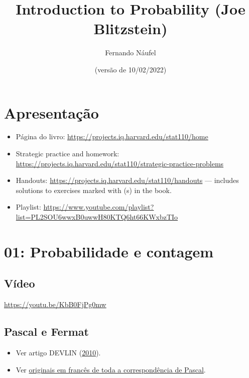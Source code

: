 \documentclass[
  11pt]{report}
\title{Introduction to Probability (Joe Blitzstein)}
\author{Fernando Náufel}
\date{(versão de 10/02/2022)}
\begin{document}
\maketitle

{
\setcounter{tocdepth}{1}
\tableofcontents
}
\hypertarget{apresentauxe7uxe3o}{%
\chapter*{Apresentação}\label{apresentauxe7uxe3o}}

\begin{itemize}
\item
  Página do livro: \url{https://projects.iq.harvard.edu/stat110/home}
\item
  Strategic practice and homework: \url{https://projects.iq.harvard.edu/stat110/strategic-practice-problems}
\item
  Handouts: \url{https://projects.iq.harvard.edu/stat110/handouts} --- includes solutions to exercises marked with (s) in the book.
\item
  Playlist: \url{https://www.youtube.com/playlist?list=PL2SOU6wwxB0uwwH80KTQ6ht66KWxbzTIo}
\end{itemize}

\hypertarget{probabilidade-e-contagem}{%
\chapter*{01: Probabilidade e contagem}\label{probabilidade-e-contagem}}

\hypertarget{vuxeddeo}{%
\section*{Vídeo}\label{vuxeddeo}}

\begin{center} \url{https://youtu.be/KbB0FjPg0mw} \end{center}

\hypertarget{pascal-e-fermat}{%
\section*{Pascal e Fermat}\label{pascal-e-fermat}}

\begin{itemize}
\item
  Ver artigo DEVLIN (\protect\hyperlink{ref-devlin-2010-pascal-fermat}{2010}).
\item
  Ver \href{https://gallica.bnf.fr/ark:/12148/bpt6k69975r.image.r=Blaise+Pascal.f233.langFR}{originais em francês de toda a correspondência de Pascal}.
\end{itemize}
\end{document}
